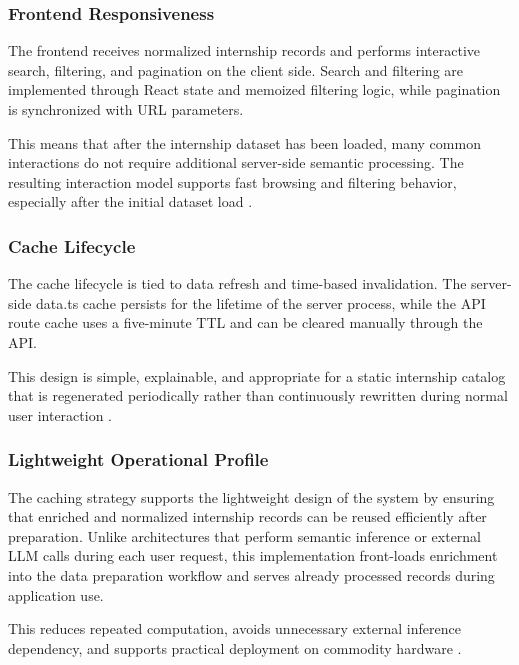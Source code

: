 \subsubsection*{Frontend Responsiveness}

The frontend receives normalized internship records and performs interactive search, filtering, and pagination on the client side. Search and filtering are implemented through React state and memoized filtering logic, while pagination is synchronized with URL parameters.

This means that after the internship dataset has been loaded, many common interactions do not require additional server-side semantic processing. The resulting interaction model supports fast browsing and filtering behavior, especially after the initial dataset load \cite{riva2022realworld, jain1991art}.

\subsubsection*{Cache Lifecycle}

The cache lifecycle is tied to data refresh and time-based invalidation. The server-side data.ts cache persists for the lifetime of the server process, while the API route cache uses a five-minute TTL and can be cleared manually through the API.

This design is simple, explainable, and appropriate for a static internship catalog that is regenerated periodically rather than continuously rewritten during normal user interaction \cite{smith1982cache}.

\subsubsection*{Lightweight Operational Profile}

The caching strategy supports the lightweight design of the system by ensuring that enriched and normalized internship records can be reused efficiently after preparation. Unlike architectures that perform semantic inference or external LLM calls during each user request, this implementation front-loads enrichment into the data preparation workflow and serves already processed records during application use.

This reduces repeated computation, avoids unnecessary external inference dependency, and supports practical deployment on commodity hardware \cite{schwartz2020green, menghani2023efficient}.

